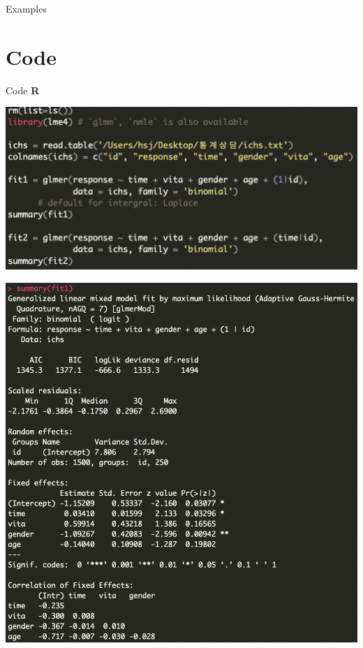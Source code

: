 \documentclass[9pt, xelatex]{beamer}
\begin{document}
{\begin{frame}[allowframebreaks]{Examples}
	\end{frame}
}


\section{Code}{
	\begin{frame}[allowframebreaks]{Code}
		\textbf{R} \\ 
		\vspace{4mm}
		\begin{center}
			\includegraphics[scale=0.5]{rcode.png} 
		\end{center}
		
		\framebreak
		
		\begin{center}
			\includegraphics[scale=0.35]{rfit1.png} 
		\end{center} 
	 

\end{frame}}
\end{document}
